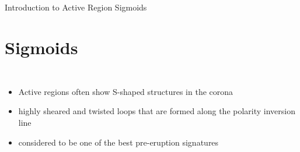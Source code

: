 \documentclass{beamer}
\begin{document}
\begin{frame}{Introduction to Active Region Sigmoids}
\section{Sigmoids}
\begin{columns}[t]
\begin{itemize}
 \item Active regions often show S-shaped structures in the corona
 \item highly sheared and twisted loops that are formed along the polarity inversion line
 \item considered to be one of the best pre-eruption
signatures
\end{itemize}

\end{columns}
\end{frame}
\end{document}
